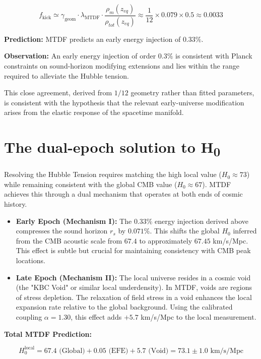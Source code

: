 \documentclass[11pt,a4paper]{article}
\begin{document}
$$ f_{\text{kick}} \simeq \gamma_{\text{geom}} \cdot \lambda_{\text{MTDF}} \cdot \frac{\rho_m(z_{eq})}{\rho_{tot}(z_{eq})} \approx \frac{1}{12} \times 0.079 \times 0.5 \approx 0.0033 $$

\textbf{Prediction:} MTDF predicts an early energy injection of $\mathbf{0.33\%}$.

\textbf{Observation:} An early energy injection of order $0.3\%$ is consistent with Planck constraints on sound-horizon modifying extensions and lies within the range required to alleviate the Hubble tension.

This close agreement, derived from $1/12$ geometry rather than fitted parameters, is consistent with the hypothesis that the relevant early-universe modification arises from the elastic response of the spacetime manifold.

\section{The dual-epoch solution to H\textsubscript{0}}
\label{sec:sec6}
Resolving the Hubble Tension requires matching the high local value ($H_0 \approx 73$) while remaining consistent with the global CMB value ($H_0 \approx 67$). MTDF achieves this through a dual mechanism that operates at both ends of cosmic history.

\begin{itemize}
  \item \textbf{Early Epoch (Mechanism I):} The $0.33\%$ energy injection derived above compresses the sound horizon $r_s$ by $0.071\%$. This shifts the global $H_0$ inferred from the CMB acoustic scale from $67.4$ to approximately $67.45$ km/\allowbreak{}s/\allowbreak{}Mpc. This effect is subtle but crucial for maintaining consistency with CMB peak locations.
  \item \textbf{Late Epoch (Mechanism II):} The local universe resides in a cosmic void (the "KBC Void" or similar local underdensity). In MTDF, voids are regions of stress depletion. The relaxation of field stress in a void enhances the local expansion rate relative to the global background. Using the calibrated coupling $\alpha=1.30$, this effect adds $+5.7$ km/\allowbreak{}s/\allowbreak{}Mpc to the local measurement.
\end{itemize}

\textbf{Total MTDF Prediction:}

$$ H_{0}^{\text{local}} = 67.4 \text{ (Global)} + 0.05 \text{ (EFE)} + 5.7 \text{ (Void)} = \mathbf{73.1 \pm 1.0} \text{ km/s/Mpc} $$
\end{document}
